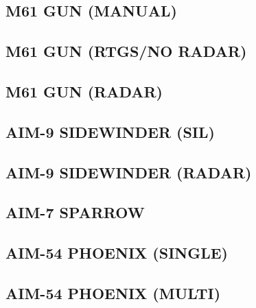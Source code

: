 \documentclass[8pt,usenames,dvipsnames,twoside]{article}
\begin{document}
\begin{multicols*}{2}
		\subsection{M61 GUN (MANUAL)}
		\subsection{M61 GUN (RTGS/NO RADAR)}
		\subsection{M61 GUN (RADAR)}
		\subsection{AIM-9 SIDEWINDER (SIL)}
		\subsection{AIM-9 SIDEWINDER (RADAR)}
		\subsection{AIM-7 SPARROW}
		\subsection{AIM-54 PHOENIX (SINGLE)}
		\subsection{AIM-54 PHOENIX (MULTI)}
		
	
	    \cleardoublepage
	    \columnbreak
	\end{multicols*}
\iftoggle{print}{
\pagestyle{empty}
\newpage \null
\thumbwide
\newpage \null
}{}
\end{document}
